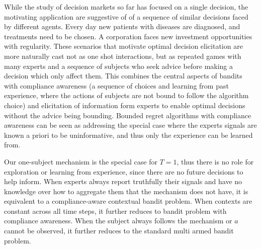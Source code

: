 



While the study of decision markets so far has focused on a single decision, the motivating application are suggestive of of a sequence of similar decisions faced by different agents.
Every day new patients with diseases are diagnosed, and treatments need to be chosen. 
A corporation faces new investment opportunities with regularity.
These scenarios that motivate optimal decision elicitation are more naturally cast not as one shot interactions, but as repeated games with many experts and a sequence of subjects who seek advice before making a decision which only affect them.
This combines the central aspects of bandits with compliance awareness (a sequence of choices and learning from past experience, where the actions of subjects are not bound to follow the algorithm choice) and elicitation of information form experts to enable optimal decisions without the advice being bounding. 
Bounded regret algorithms with compliance awareness can be seen as addressing the special case where the experts signals are known a priori to be uninformative, and thus only the experience can be learned from.

Our one-subject mechanism is the special case for $T={1}$, thus there is no role for exploration or learning from experience, since there are no future decisions  to help inform.
When experts always report truthfully their signals and  have no knowledge over how to aggregate them that the mechanism does not have,  it is equivalent to a compliance-aware contextual bandit problem. 
When contexts are constant across all time steps, it further reduces to bandit problem with compliance awareness.
When the subject always follows the mechanism or $a$ cannot be observed, it further reduces to the standard multi armed bandit problem. 

